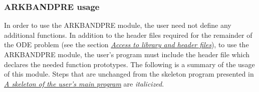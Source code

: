 \documentclass[letterpaper,10pt,english]{sphinxmanual}
\begin{document}
\subsubsection{ARKBANDPRE usage}
\label{c_interface/Preconditioners:arkbandpre-usage}
In order to use the ARKBANDPRE module, the user need not define
any additional functions.  In addition to the header files required
for the remainder of the ODE problem (see the section
{\hyperref[c_interface/General:cinterface-headers]{\emph{Access to library and header files}}}), to use the ARKBANDPRE module, the user's
program must include the header file  which
declares the needed function prototypes.  The following is a summary
of the usage of this module.  Steps that are unchanged from the
skeleton program presented in {\hyperref[c_interface/Skeleton:cinterface-skeleton]{\emph{A skeleton of the user's main program}}} are
\emph{italicized}.
\end{document}
